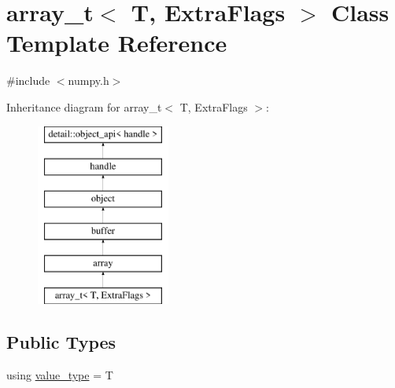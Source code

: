 \hypertarget{classarray__t}{}\section{array\+\_\+t$<$ T, Extra\+Flags $>$ Class Template Reference}
\label{classarray__t}


{\ttfamily \#include $<$numpy.\+h$>$}

Inheritance diagram for array\+\_\+t$<$ T, Extra\+Flags $>$\+:\begin{figure}[H]
\begin{center}
\leavevmode
\includegraphics[height=6.000000cm]{classarray__t}
\end{center}
\end{figure}
\subsection*{Public Types}
\begin{DoxyCompactItemize}
\item 
using \mbox{\hyperlink{classarray__t_a8d5309087f29c7ad8a9187ec9756a6c2}{value\+\_\+type}} = T
\end{DoxyCompactItemize}
